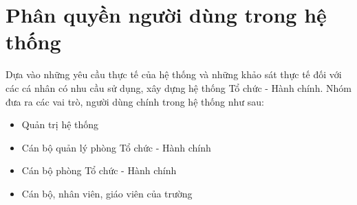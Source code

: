\section{Phân quyền người dùng trong hệ thống}
Dựa vào những yêu cầu thực tế của hệ thống và những khảo sát thực tế đối với các cá nhân có nhu cầu sử dụng, xây dựng hệ thống Tổ chức - Hành chính. Nhóm đưa ra các vai trò, người dùng chính trong hệ thống như sau:
\begin{itemize}
    \item Quản trị hệ thống
    \item Cán bộ quản lý phòng Tổ chức - Hành chính
    \item Cán bộ phòng Tổ chức - Hành chính
    \item Cán bộ, nhân viên, giáo viên của trường
\end{itemize}
